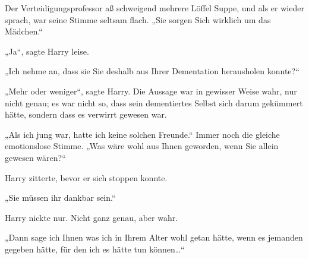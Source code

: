 Der Verteidigungsprofessor aß schweigend mehrere Löffel Suppe, und als er wieder sprach, war seine Stimme seltsam flach. „Sie sorgen Sich wirklich um das Mädchen.“

„Ja“, sagte Harry leise.

„Ich nehme an, dass sie Sie deshalb aus Ihrer Dementation herausholen konnte?“

„Mehr oder weniger“, sagte Harry. Die Aussage war in gewisser Weise wahr, nur nicht genau; es war nicht so, dass sein dementiertes Selbst sich darum gekümmert hätte, sondern dass es verwirrt gewesen war.

„Als ich jung war, hatte ich keine solchen Freunde.“ Immer noch die gleiche emotionslose Stimme. „Was wäre wohl aus Ihnen geworden, wenn Sie allein gewesen wären?“

Harry zitterte, bevor er sich stoppen konnte.

„Sie müssen ihr dankbar sein.“

Harry nickte nur. Nicht ganz genau, aber wahr.

„Dann sage ich Ihnen was ich in Ihrem Alter wohl getan hätte, wenn es jemanden gegeben hätte, für den ich es hätte tun können…“


